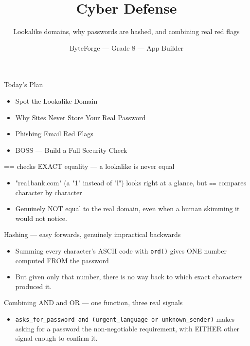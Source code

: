 \documentclass[aspectratio=169]{beamer}
\title{Cyber Defense}
\subtitle{Lookalike domains, why passwords are hashed, and combining real red flags}
\author{ByteForge --- Grade 8 --- App Builder}
\date{}
\begin{document}
\begin{frame}
    \titlepage
\end{frame}

\begin{frame}{Today's Plan}
    \begin{itemize}
        \item Spot the Lookalike Domain
        \item Why Sites Never Store Your Real Password
        \item Phishing Email Red Flags
        \item[$\bigstar$] BOSS --- Build a Full Security Check
    \end{itemize}
\end{frame}

\begin{frame}{== checks EXACT equality — a lookalike is never equal}
    \large
    \begin{itemize}
        \item "rea1bank.com" (a "1" instead of "l") looks right at a glance, but \texttt{==} compares character by character
        \item Genuinely NOT equal to the real domain, even when a human skimming it would not notice.
    \end{itemize}
\end{frame}


\begin{frame}{Hashing — easy forwards, genuinely impractical backwards}
    \large
    \begin{itemize}
        \item Summing every character's ASCII code with \texttt{ord()} gives ONE number computed FROM the password
        \item But given only that number, there is no way back to which exact characters produced it.
    \end{itemize}
\end{frame}


\begin{frame}{Combining AND and OR — one function, three real signals}
    \large
    \begin{itemize}
        \item \texttt{asks\_for\_password and (urgent\_language or unknown\_sender)} makes asking for a password the non-negotiable requirement, with EITHER other signal enough to confirm it.
    \end{itemize}
\end{frame}
\end{document}

